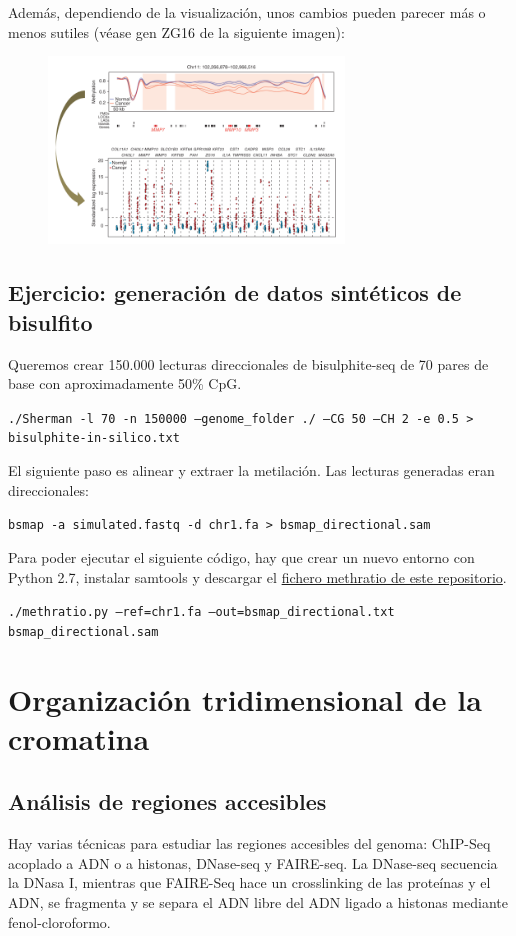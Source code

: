 Además, dependiendo de la visualización, unos cambios pueden parecer más o menos sutiles (véase gen ZG16 de la siguiente imagen):

\begin{figure}[h]
\centering
\includegraphics[width = 0.7\textwidth]{figs/met-vis.png}
\end{figure}

\subsection{Ejercicio: generación de datos sintéticos de bisulfito}
Queremos crear 150.000 lecturas direccionales de bisulphite-seq de 70 pares de base con aproximadamente 50\% CpG. 

\texttt{./Sherman -l 70 -n 150000 --genome\_folder ./ --CG 50 --CH 2 -e 0.5 > bisulphite-in-silico.txt}

El siguiente paso es alinear y extraer la metilación. Las lecturas generadas eran direccionales:

\texttt{bsmap -a simulated.fastq -d chr1.fa > bsmap\_directional.sam}

Para poder ejecutar el siguiente código, hay que crear un nuevo entorno con Python 2.7, instalar samtools y descargar el \href{https://github.com/dpryan79/Answers/tree/master/biostars_112049}{fichero methratio de este repositorio}.

\texttt{./methratio.py --ref=chr1.fa --out=bsmap\_directional.txt bsmap\_directional.sam}

\section{Organización tridimensional de la cromatina}
\subsection{Análisis de regiones accesibles}
Hay varias técnicas para estudiar las regiones accesibles del genoma: ChIP-Seq acoplado a ADN o a histonas, DNase-seq y FAIRE-seq. La DNase-seq secuencia la DNasa I, mientras que FAIRE-Seq hace un crosslinking de las proteínas y el ADN, se fragmenta y se separa el ADN libre del ADN ligado a histonas mediante fenol-cloroformo. 


